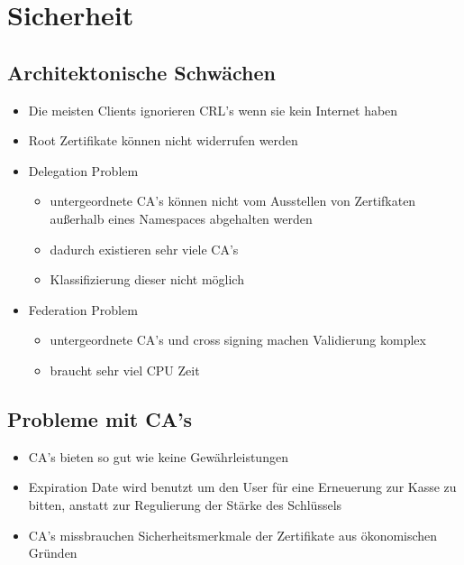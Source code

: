 \chapter{Sicherheit}
\section{Architektonische Schwächen}

  \begin{itemize}
    \item Die meisten Clients ignorieren CRL's wenn sie kein Internet haben
    \item Root Zertifikate können nicht widerrufen werden
  \end{itemize}

    

  \begin{itemize}
    \item Delegation Problem
        \begin{itemize}
            \item untergeordnete CA's können nicht vom Ausstellen von Zertifkaten außerhalb eines Namespaces abgehalten werden
            \item dadurch existieren sehr viele CA's
            \item Klassifizierung dieser nicht möglich
        \end{itemize}
  \end{itemize}

    

  \begin{itemize}
    \item Federation Problem
        \begin{itemize}
            \item untergeordnete CA's und cross signing machen Validierung komplex
            \item braucht sehr viel CPU Zeit
        \end{itemize}
  \end{itemize}

    
\section{Probleme mit CA's}

  \begin{itemize}
    \item CA's bieten so gut wie keine Gewährleistungen
    \item Expiration Date wird benutzt um den User für eine Erneuerung zur Kasse zu bitten, anstatt zur Regulierung der Stärke des Schlüssels
    \item CA's missbrauchen Sicherheitsmerkmale der Zertifikate aus ökonomischen Gründen
  \end{itemize}



